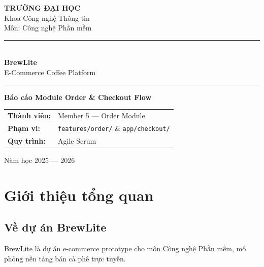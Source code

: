 \documentclass[12pt,a4paper]{article}
\begin{document}
\begin{titlepage}
\begin{center}
\vspace*{1cm}
{\Large\textbf{TRƯỜNG ĐẠI HỌC}}\\[0.3cm]
{\large Khoa Công nghệ Thông tin}\\[0.2cm]
{\normalsize Môn: Công nghệ Phần mềm}

\vspace{2cm}
\rule{10cm}{1pt}\\[0.5cm]
{\Huge\textbf{BrewLite}}\\[0.3cm]
{\large E-Commerce Coffee Platform}\\[0.5cm]
\rule{10cm}{1pt}

\vspace{1.5cm}
{\LARGE\textbf{Báo cáo Module Order \& Checkout Flow}}

\vspace{1.5cm}
{\large
\begin{tabular}{ll}
\textbf{Thành viên:} & Member 5 — Order Module \\
\textbf{Phạm vi:}    & \texttt{features/order/} \& \texttt{app/checkout/} \\
\textbf{Quy trình:}  & Agile Scrum \\
\end{tabular}
}

\vfill
{\normalsize Năm học 2025 — 2026}
\end{center}
\end{titlepage}

\tableofcontents
\newpage

\section{Giới thiệu tổng quan}

\subsection{Về dự án BrewLite}

BrewLite là dự án e-commerce prototype cho môn Công nghệ Phần mềm, mô phỏng nền tảng bán cà phê trực tuyến.
\end{document}
